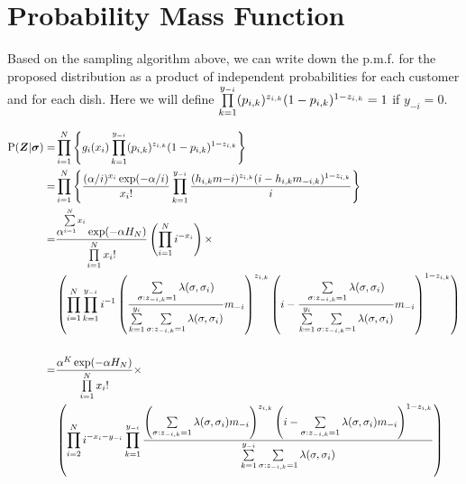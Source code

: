 \section{Probability Mass Function}
Based on the sampling algorithm above, we can write down the p.m.f. for the
proposed distribution as a product of independent probabilities for 
each customer and for each dish. Here we will define 
$\prod\limits_{k=1}^{y_{-i}} (p_{i,k})^{z_{i,k}}(1-p_{i,k})^{1-z_{i,k}}=1$ if $y_{-i}=0$.

\begin{align*}
  \text{P}(\bm Z|\bm\sigma)
  =&\prod\limits_{i=1}^{N} \left\{g_i(x_i) \prod\limits_{k=1}^{y_{-i}} 
    (p_{i,k})^{z_{i,k}}(1-p_{i,k})^{1-z_{i,k}}\right\}\\
  =&\prod\limits_{i=1}^{N} \left\{ \displaystyle\frac{(\alpha/i)^{x_i}\exp(-\alpha/i)}{x_i!} 
    \prod\limits_{k=1}^{y_{-i}} 
    \displaystyle\frac{(h_{i,k}m{-i})^{z_{i,k}}(i-h_{i,k}m_{-i,k})^{1-z_{i,k}}}{i} 
    \right\} \\
  =&\displaystyle\frac{\alpha^{\sum\limits_{i=1}^{N}x_i} \exp(-\alpha H_N)} {\prod\limits_{i=1}^{N}x_i!} 
    \left( \prod\limits_{i=1}^{N}i^{-x_i} \right) \times
    \\
    &\left( \prod\limits_{i=1}^{N}\prod\limits_{k=1}^{y_{-i}} i^{-1}
    \displaystyle\left(\displaystyle\frac{\sum\limits_{\sigma:z_{-i,k}=1}^{}\lambda(\sigma,\sigma_i)} {\sum\limits_{k=1}^{y_i}\sum\limits_{\sigma:z_{-i,k}=1}^{}\lambda(\sigma,\sigma_i)} m_{-i}\right)^{z_{i,k}}
       \left(i-\displaystyle\frac{\sum\limits_{\sigma:z_{-i,k}=1}^{}\lambda(\sigma,\sigma_i)} {\sum\limits_{k=1}^{y_i}\sum\limits_{\sigma:z_{-i,k}=1}^{}\lambda(\sigma,\sigma_i)} m_{-i}\right)^{1-z_{i,k}} \right)\\
   &\\
  =&\displaystyle\frac{\alpha^K \exp(-\alpha H_N)} {\prod\limits_{i=1}^{N}x_i!} \times
    \\
    &\left( \prod\limits_{i=2}^{N} i^{-x_i-y_{-i}}\prod\limits_{k=1}^{y_{-i}} 
    \displaystyle\frac{
    \left(\sum\limits_{\sigma:z_{-i,k}=1}^{}\lambda(\sigma,\sigma_i)m_{-i}\right)^{z_{i,k}}
    \left(i-\sum\limits_{\sigma:z_{-i,k}=1}^{}
    \lambda(\sigma,\sigma_i)m_{-i}\right)^{1-z_{i,k}}
    }
    {\sum\limits_{k=1}^{y_{-i}}\sum\limits_{\sigma:z_{-i,k}=1}^{}\lambda(\sigma,\sigma_i)}\right)
\end{align*}


